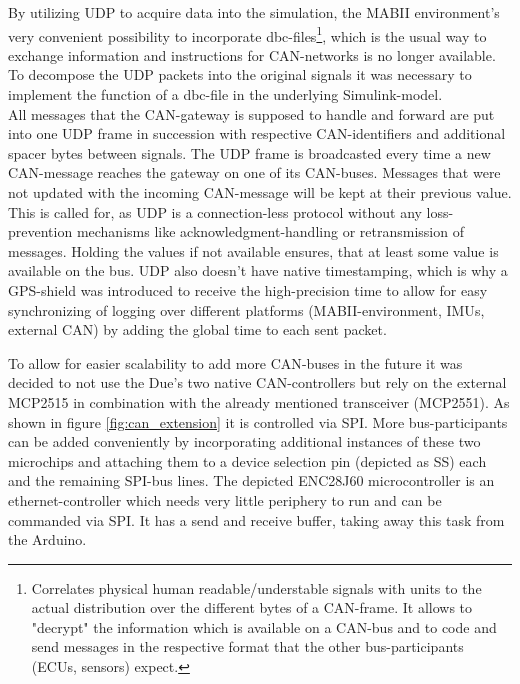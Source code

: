 \documentclass[ExampleMasters.tex]{subfiles}
\begin{document}
By utilizing \gls{UDP} to acquire data into the simulation, the \gls{MABII} environment's very convenient possibility to incorporate \gls{dbc}-files\footnote{Correlates physical human readable/understable signals with units to the actual distribution over the different bytes of a \gls{CAN}-frame. It allows to "decrypt" the information which is available on a \gls{CAN}-bus and to code and send messages in the respective format that the other bus-participants (ECUs, sensors) expect.}, which is the usual way to exchange information and instructions for \gls{CAN}-networks is no longer available. To decompose the \gls{UDP} packets into the original signals it was necessary to implement the function of a \gls{dbc}-file in the underlying Simulink-model. \\
All messages that the CAN-gateway is supposed to handle and forward are put into one \gls{UDP} frame in succession with respective CAN-identifiers and additional spacer bytes between signals. The \gls{UDP} frame is broadcasted every time a new CAN-message reaches the gateway on one of its \gls{CAN}-buses. Messages that were not updated with the incoming \gls{CAN}-message will be kept at their previous value. This is called for, as \gls{UDP} is a connection-less protocol without any loss-prevention mechanisms like acknowledgment-handling or retransmission of messages. Holding the values if not available ensures, that at least some value is available on the bus. \gls{UDP} also doesn't have native timestamping, which is why a \gls{GPS}-shield was introduced to receive the high-precision time to allow for easy synchronizing of logging over different platforms (\gls{MABII}-environment, \gls{IMU}s, external \gls{CAN}) by adding the global time to each sent packet.

To allow for easier scalability to add more \gls{CAN}-buses in the future it was decided to not use the Due's two native CAN-controllers but rely on the external MCP2515 in combination with the already mentioned transceiver (MCP2551). As shown in figure \ref{fig:can_extension} it is controlled via \gls{SPI}. More bus-participants can be added conveniently by incorporating additional instances of these two microchips and attaching them to a device selection pin (depicted as SS) each and the remaining \gls{SPI}-bus lines. The depicted ENC28J60 microcontroller is an ethernet-controller which needs very little periphery to run and can be commanded via SPI. It has a send and receive buffer, taking away this task from the Arduino.\\
\end{document}
